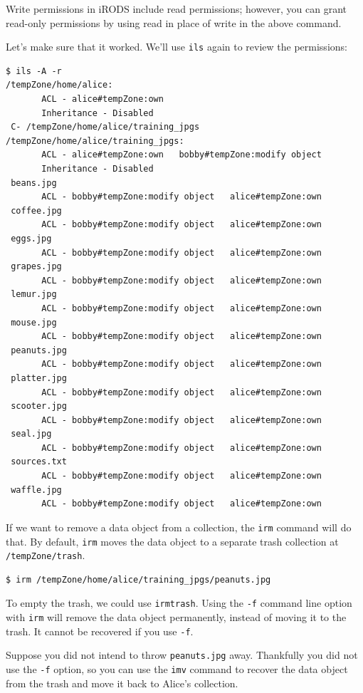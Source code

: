 \documentclass[10pt,oneside]{memoir}
\begin{document}
Write permissions in iRODS include read permissions; however, you can grant read-only permissions by using read in place of write in the above command.

Let's make sure that it worked. We'll use \texttt{ils} again to review the permissions:

\begin{lstlisting}[basicstyle=\tiny\ttfamily]
$ ils -A -r
/tempZone/home/alice:
       ACL - alice#tempZone:own
       Inheritance - Disabled
 C- /tempZone/home/alice/training_jpgs
/tempZone/home/alice/training_jpgs:
       ACL - alice#tempZone:own   bobby#tempZone:modify object
       Inheritance - Disabled
 beans.jpg
       ACL - bobby#tempZone:modify object   alice#tempZone:own
 coffee.jpg
       ACL - bobby#tempZone:modify object   alice#tempZone:own
 eggs.jpg
       ACL - bobby#tempZone:modify object   alice#tempZone:own
 grapes.jpg
       ACL - bobby#tempZone:modify object   alice#tempZone:own
 lemur.jpg
       ACL - bobby#tempZone:modify object   alice#tempZone:own
 mouse.jpg
       ACL - bobby#tempZone:modify object   alice#tempZone:own
 peanuts.jpg
       ACL - bobby#tempZone:modify object   alice#tempZone:own
 platter.jpg
       ACL - bobby#tempZone:modify object   alice#tempZone:own
 scooter.jpg
       ACL - bobby#tempZone:modify object   alice#tempZone:own
 seal.jpg
       ACL - bobby#tempZone:modify object   alice#tempZone:own
 sources.txt
       ACL - bobby#tempZone:modify object   alice#tempZone:own
 waffle.jpg
       ACL - bobby#tempZone:modify object   alice#tempZone:own
\end{lstlisting}

If we want to remove a data object from a collection, the \texttt{irm} command will do that. By default, \texttt{irm} moves the data object to a separate trash collection at \texttt{/tempZone/trash}.

\begin{lstlisting}
$ irm /tempZone/home/alice/training_jpgs/peanuts.jpg
\end{lstlisting}

To empty the trash, we could use \texttt{irmtrash}. Using the \texttt{-f} command line option with \texttt{irm} will remove the data object permanently, instead of moving it to the trash. It cannot be recovered if you use \texttt{-f}.

Suppose you did not intend to throw \texttt{peanuts.jpg} away. Thankfully you did not use the
\texttt{-f} option, so you can use the \texttt{imv} command to recover the data object from the trash and move it back to Alice's collection.
\end{document}
